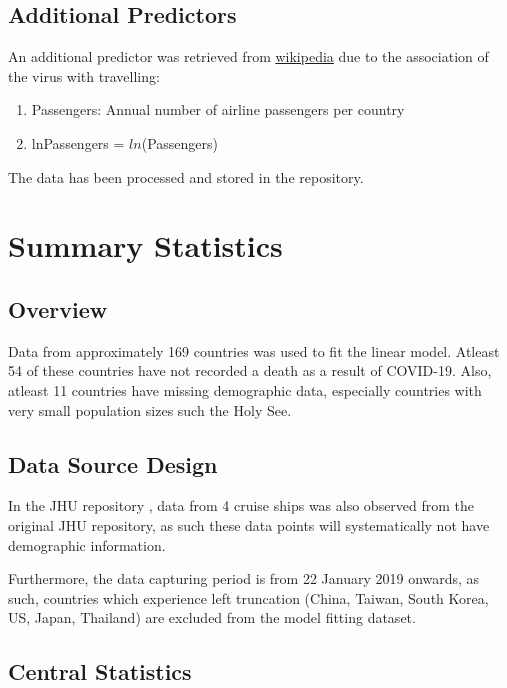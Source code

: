 \documentclass[]{report}
\begin{document}
\subsection{Additional Predictors}

An additional predictor was retrieved from  \href{https://en.wikipedia.org/wiki/List_of_countries_by_airline_passengers}{wikipedia} \cite{wikipedia} due to the association of the virus with travelling:

\begin{enumerate}
	
	\item Passengers: Annual number of airline passengers per country
	
	\item lnPassengers = $ln$(Passengers)
\end{enumerate}

The data has been processed and stored in the repository.


\section{Summary Statistics}

\subsection*{Overview}

Data from approximately 169 countries was used to fit the linear model. Atleast 54 of these countries have not recorded a death as a result of COVID-19. Also, atleast 11 countries have missing demographic data, especially countries with very small population sizes such the Holy See. 

\subsection*{Data Source Design}

In the JHU repository \cite{jhu}, data from 4 cruise ships was also observed from the original JHU repository, as such these data points will systematically not have demographic information. 

Furthermore, the data capturing period is from 22 January 2019 onwards, as such, countries which experience left truncation (China, Taiwan, South Korea, US, Japan, Thailand) are excluded from the model fitting dataset.

\newpage

\subsection*{Central Statistics}
\end{document}
